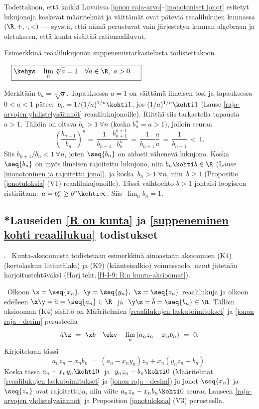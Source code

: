 Todettakoon, että kaikki Luvuissa \ref{jonon raja-arvo}--\ref{monotoniset jonot} esitetyt
lukujonoja koskevat määritelmät ja väittämät ovat päteviä reaalilukujen kunnassa
$(\R,+,\cdot,<)$ --- syystä, että nämä perustuvat vain järjestetyn kunnan algebraan ja
oletukseen, että kunta sisältää rationaaliluvut. 

Esimerkkinä reaalilukujonon suppenemistarkastelusta todistettakoon
\begin{Prop} \label{juurilemma} $\quad \displaystyle{\boxed{\kehys\quad 
\lim_n \sqrt[n]{a}=1 \quad \forall a\in\R,\ a>0. \quad}}$ 
\end{Prop}
\tod Merkitään $b_n=\sqrt[n]{a}$. Tapauksessa $a=1$ on väittämä ilmeisen tosi ja tapauksessa 
$0<a<1$ pätee: $\,b_n=1/(1/a)^{1/n} \kohti 1$, jos $(1/a)^{1/n} \kohti 1$ 
(Lause \ref{raja-arvojen yhdistelysäännöt} reaalilukujonoille). Riittää siis tarkastella
tapausta $a>1$. Tällöin on oltava $b_n>1\ \forall n$ (koska $b_n^n=a>1$), jolloin seuraa
\[
\left(\frac{b_{n+1}}{b_n}\right)^n =\, \frac{1}{b_{n+1}}\frac{b_{n+1}^{n+1}}{b_n^n}
\,=\, \frac{1}{b_{n+1}}\frac{a}{a} \,=\, \frac{1}{b_{n+1}} \,<\, 1. 
\]  
Siis $b_{n+1}/b_n<1\ \forall n$, joten $\seq{b_n}$ on aidosti vähenevä lukujono. Koska 
$\seq{b_n}$ on myös ilmeisen rajoitettu lukujono, niin $b_n \kohti b\in\R$
(Lause \ref{monotoninen ja rajoitettu jono}), ja koska $\,b_n>1\ \forall n$, niin $\,b \ge 1$
(Propositio \ref{jonotuloksia} (V1) reaalilukujonoille). Tässä vaihtoehto $b>1$ johtaisi
loogiseen ristiriitaan: $\,a=b_n^n \ge b^n\kohti\infty$. Siis $\,\lim_n b_n=1$. \loppu 

\subsection*{*Lauseiden \ref{R on kunta} ja \ref{suppeneminen kohti reaalilukua} todistukset}

. \ Kunta-aksioomista todistetaan esimerkkinä ainoastaan 
aksioomien (K4) (kertolaskun liitäntälaki) ja (K9) (käänteisalkio) voimassaolo, muut
jätetään harjoitustehtäväksi (Harj.teht.\,\ref{H-I-9: R:n kunta-aksioomat}). 

 \ Olkoon $\x = \seq{x_n},\ \y = \seq{y_n},\ \z = \seq{z_n}$ reaalilukuja ja olkoon
edelleen $\x\y = \breve{a} = \seq{a_n} \in \R\ $ ja $\ \y\z = \breve{b} = \seq{b_n} \in \R$. 
Tällöin aksiooman (K4) sisältö on Määritelmien \ref{reaalilukujen laskutoimitukset}
ja \ref{jonon raja - desim} perusteella
\[
\breve{a}\z\ =\ \x\breve{b} \quad \ekv \quad \lim_n\,(a_n z_n - x_n b_n)\ =\ 0.
\]
Kirjoitetaan tässä
\[
a_n z_n - x_n b_n\ =\ (a_n - x_n y_n) z_n + x_n (y_n z_n - b_n).
\]
Koska tässä $a_n - x_n y_n \kohti 0\ $ ja $\ y_n z_n - b_n \kohti 0$ (Määritelmät 
\ref{reaalilukujen laskutoimitukset} ja \ref{jonon raja - desim}) ja jonot $\seq{x_n}$
ja $\seq{z_n}$ ovat rajoitettuja, niin väite $a_n z_n - x_n b_n \kohti 0$ seuraa Lauseen
\ref{raja-arvojen yhdistelysäännöt} ja Proposition \ref{jonotuloksia} (V3) perusteella.

